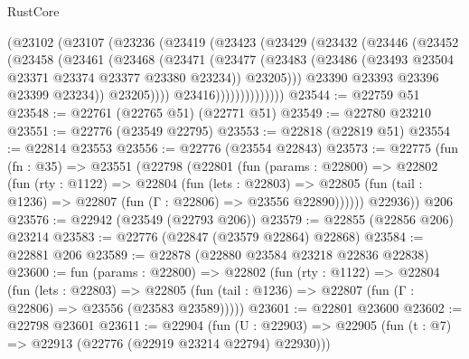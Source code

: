 \begin{lexlean}{RustCore}
\begin{coremodule}
                    (@23102
                      (@23107
                        (@23236
                          (@23419
                            (@23423
                              (@23429
                                (@23432
                                  (@23446
                                    (@23452
                                      (@23458
                                        (@23461
                                          (@23468
                                            (@23471
                                              (@23477
                                                (@23483
                                                  (@23486
                                                    (@23493
                                                      @23504
                                                      @23371
                                                      @23374
                                                      @23377
                                                      @23380
                                                      @23234))
                                                  @23205)))
                                            @23390
                                            @23393
                                            @23396
                                            @23399
                                            @23234))
                                        @23205))))
                                @23416))))))))))))))
@23544 := @22759 @51
@23548 := @22761 (@22765 @51) (@22771 @51)
@23549 := @22780 @23210
@23551 := @22776 (@23549 @22795)
@23553 := @22818 (@22819 @51)
@23554 := @22814 @23553
@23556 := @22776 (@23554 @22843)
@23573 := @22775
    (fun (fn : @35) =>
    @23551
      (@22798
        (@22801
          (fun (params : @22800) =>
          @22802
            (fun (rty : @1122) =>
            @22804
              (fun (lets : @22803) =>
              @22805 (fun (tail : @1236) => @22807 (fun (Γ : @22806) => @23556 @22890))))))
        @22936))
    @206
@23576 := @22942 (@23549 (@22793 @206))
@23579 := @22855 (@22856 @206) @23214
@23583 := @22776 (@22847 (@23579 @22864) @22868)
@23584 := @22881 @206
@23589 := @22878 (@22880 @23584 @23218 @22836 @22838)
@23600 := fun (params : @22800) =>
  @22802
    (fun (rty : @1122) =>
    @22804
      (fun (lets : @22803) =>
      @22805 (fun (tail : @1236) => @22807 (fun (Γ : @22806) => @23556 (@23583 @23589)))))
@23601 := @22801 @23600
@23602 := @22798 @23601
@23611 := @22904
    (fun (U : @22903) => @22905 (fun (t : @7) => @22913 (@22776 (@22919 @23214 @22794) @22930)))

\end{coremodule}
\end{lexlean}

